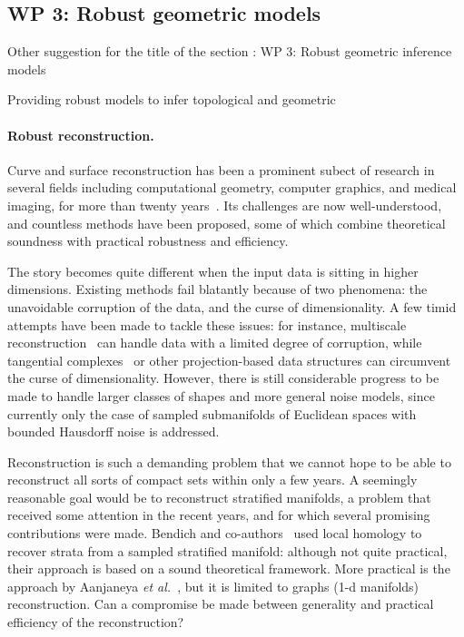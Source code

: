 \subsection*{WP 3:  Robust geometric models} 

Other suggestion for the title of the section : WP 3:  Robust geometric inference models


Providing robust models to infer topological and geometric 







\paragraph{Robust reconstruction.}

Curve and surface reconstruction has been a prominent subect of
research in several fields including computational geometry, computer
graphics, and medical imaging, for more than twenty
years~\cite{dey-csr-2007}. Its challenges are now well-understood, and
countless methods have been proposed, some of which combine
theoretical soundness with practical robustness and efficiency.

The story becomes quite different when the input data is sitting in
higher dimensions. Existing methods fail blatantly because of two
phenomena: the unavoidable corruption of the data, and the curse of
dimensionality. A few timid attempts have been made to tackle these
issues: for instance, multiscale
reconstruction~\cite{geometrica-bgo-09} can handle data with a limited
degree of corruption, while tangential
complexes~\cite{geometrica-7142i} or other projection-based data
structures can circumvent the curse of dimensionality. However, there
is still considerable progress to be made to handle larger classes of
shapes and more general noise models, since currently only the case of
sampled submanifolds of Euclidean spaces with bounded Hausdorff noise
is addressed.

Reconstruction is such a demanding problem that we cannot hope to be
able to reconstruct all sorts of compact sets within only a few
years. A seemingly reasonable goal would be to reconstruct stratified
manifolds, a problem that received some attention in the recent years,
and for which several promising contributions were made.  Bendich and
co-authors~\cite{bendich-PhD,bendich-strat1,bendich-strat2} used
local homology to recover strata from a sampled stratified manifold:
although not quite practical, their approach is based on a sound
theoretical framework. More practical is the approach by Aanjaneya
{\em et al.}~\cite{metric-graphs-reconstruction}, but it is limited to
graphs (1-d manifolds) reconstruction. Can a compromise be made
between generality and practical efficiency of the reconstruction?

